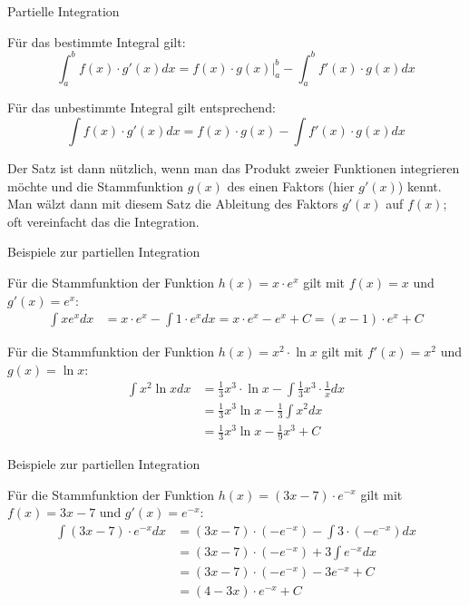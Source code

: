 \begin{frame}{Partielle Integration}
\begin{theorem}
	Für das bestimmte Integral gilt:
	\[
		\int_{a}^{b} f(x)\cdot g'(x) dx = f(x)\cdot g(x) |_{a}^{b} - \int_{a}^{b} f'(x) \cdot g(x) dx
	\]
	
	Für das unbestimmte Integral gilt entsprechend:
	\[
		\int f(x)\cdot g'(x) dx = f(x)\cdot g(x) - \int f'(x) \cdot g(x) dx
	\]
\end{theorem}
\begin{bemerkung}
	Der Satz ist dann nützlich, wenn man das Produkt zweier Funktionen integrieren möchte und die Stammfunktion $g(x)$ des einen Faktors (hier $g'(x)$) kennt. Man wälzt dann mit diesem Satz die Ableitung des Faktors $g'(x)$ auf $f(x)$; oft vereinfacht das die Integration. 
\end{bemerkung}
\end{frame}

\begin{frame}{Beispiele zur partiellen Integration}
	\begin{example}
		Für die Stammfunktion der Funktion $h(x)=x\cdot e^{x}$ gilt mit $f(x)=x$ und $g'(x)=e^{x}$:
		\begin{align*}
			\int x e^{x} dx & = x \cdot e^{x} - \int 1 \cdot e^{x} dx = x \cdot e^{x} - e^{x} + C = (x-1) \cdot e^{x} + C
 		\end{align*}
	\end{example}
	\begin{example}
		Für die Stammfunktion der Funktion $h(x)=x^{2} \cdot \ln x$ gilt mit $f'(x)=x^{2}$ und $g(x)=\ln x$:
		\begin{align*}
			\int x^2 \ln x dx & = \frac{1}{3}x^{3} \cdot \ln x - \int \frac{1}{3}x^{3} \cdot \frac{1}{x}dx \\ 
				& = \frac{1}{3}x^{3} \ln x - \frac{1}{3} \int x^{2} dx \\ 
				& = \frac{1}{3}x^{3} \ln x - \frac{1}{9} x^{3} + C
 		\end{align*}
	\end{example}
	
\end{frame}

\begin{frame}{Beispiele zur partiellen Integration}
\begin{example}
	Für die Stammfunktion der Funktion $h(x)=(3x-7)\cdot e^{-x}$ gilt mit $f(x)=3x-7$ und $g'(x)=e^{-x}$:
		\begin{align*}
			\int (3x-7) \cdot e^{-x} dx & = (3x-7)\cdot (-e^{-x}) - \int 3 \cdot (-e^{-x}) dx \\
			& = (3x-7)\cdot (-e^{-x}) + 3 \int e^{-x} dx \\
			& = (3x-7)\cdot (-e^{-x}) - 3 e^{-x} + C\\
			& = (4-3x)\cdot e^{-x} +C
		\end{align*}
\end{example}
\end{frame}

